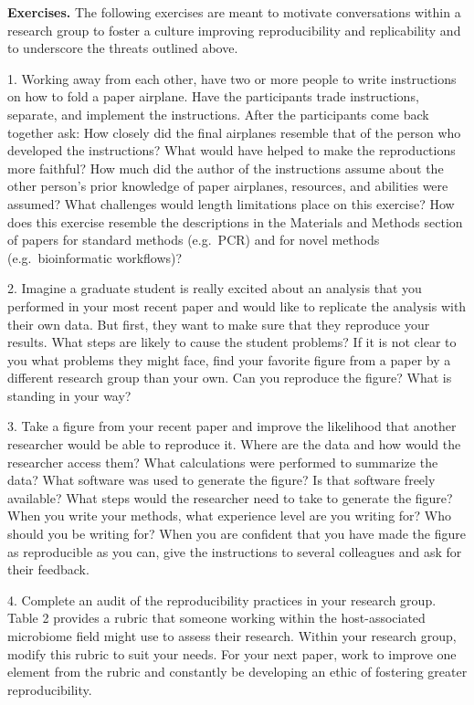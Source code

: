 \documentclass[]{article}
\begin{document}
\textbf{Exercises.} The following exercises are meant to motivate
conversations within a research group to foster a culture improving
reproducibility and replicability and to underscore the threats outlined
above.

1. Working away from each other, have two or more people to write
instructions on how to fold a paper airplane. Have the participants
trade instructions, separate, and implement the instructions. After the
participants come back together ask: How closely did the final airplanes
resemble that of the person who developed the instructions? What would
have helped to make the reproductions more faithful? How much did the
author of the instructions assume about the other person's prior
knowledge of paper airplanes, resources, and abilities were assumed?
What challenges would length limitations place on this exercise? How
does this exercise resemble the descriptions in the Materials and
Methods section of papers for standard methods (e.g.~PCR) and for novel
methods (e.g.~bioinformatic workflows)?

2. Imagine a graduate student is really excited about an analysis that
you performed in your most recent paper and would like to replicate the
analysis with their own data. But first, they want to make sure that
they reproduce your results. What steps are likely to cause the student
problems? If it is not clear to you what problems they might face, find
your favorite figure from a paper by a different research group than
your own. Can you reproduce the figure? What is standing in your way?

3. Take a figure from your recent paper and improve the likelihood that
another researcher would be able to reproduce it. Where are the data and
how would the researcher access them? What calculations were performed
to summarize the data? What software was used to generate the figure? Is
that software freely available? What steps would the researcher need to
take to generate the figure? When you write your methods, what
experience level are you writing for? Who should you be writing for?
When you are confident that you have made the figure as reproducible as
you can, give the instructions to several colleagues and ask for their
feedback.

4. Complete an audit of the reproducibility practices in your research
group. Table 2 provides a rubric that someone working within the
host-associated microbiome field might use to assess their research.
Within your research group, modify this rubric to suit your needs. For
your next paper, work to improve one element from the rubric and
constantly be developing an ethic of fostering greater reproducibility.
\end{document}
